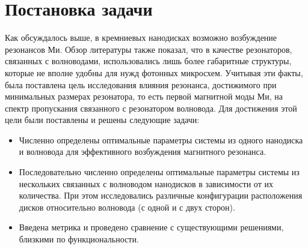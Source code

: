 \chapter{Постановка задачи}

Как обсуждалось выше, в кремниевых нанодисках возможно возбуждение резонансов Ми. Обзор литературы также показал, что в качестве резонаторов, связанных с волноводами, использовались лишь более габаритные структуры, которые не вполне удобны для нужд фотонных микросхем. Учитывая эти факты, была поставлена цель исследования влияния резонанса, достижимого при минимальных размерах резонатора, то есть первой магнитной моды Ми, на спектр пропускания связанного с резонатором волновода. Для достижения этой цели были поставлены и решены следующие задачи:

\begin{itemize}
	\item Численно определены оптимальные параметры системы из одного нанодиска и волновода для эффективного возбуждения магнитного резонанса.
	\item Последовательно численно определены оптимальные параметры системы из нескольких связанных с волноводом нанодисков в зависимости от их количества. При этом исследовались различные конфигурации расположения дисков относительно волновода (с одной и с двух сторон).
	\item Введена метрика и проведено сравнение с существующими решениями, близкими по функциональности.
\end{itemize}